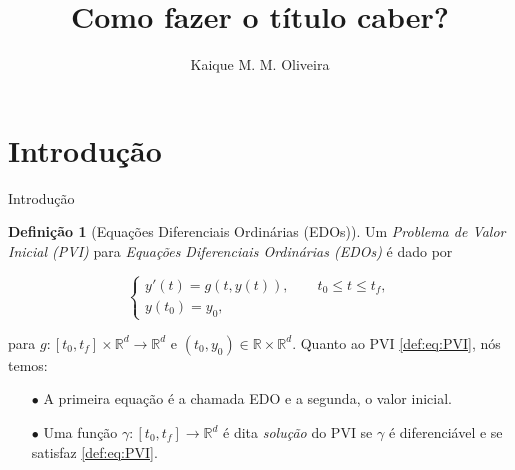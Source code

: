\documentclass{beamer}
\title{Como fazer o título caber?}
\author[Kaique Oliveira]{Kaique M. M. Oliveira}
\newcommand{\R}{\mathbb{R}}
\theoremstyle{plain}
\theoremstyle{definition}
\newtheorem{defi}{Definição}
\begin{document}
\typesetFrontSlides







\section{Introdução}
\begin{frame}{Introdução}

    \begin{defi}[Equações Diferenciais Ordinárias (EDOs)]
        \label{def:1:EDO} 
        Um \textit{Problema de Valor Inicial (PVI)} para \textit{Equações Diferenciais Ordinárias (EDOs)} é dado por


        \begin{equation}
            \begin{cases}
                y'(t) = g(t, y(t)), \qquad t_0 \leq t\leq t_f,\\
                y(t_0) = y_0,
            \end{cases}
            \label{def:eq:PVI}
        \end{equation}



        para $g: [t_0, t_f] \times \R^d \to \R^d$ e $(t_0, y_0) \in \R \times \R^d$. Quanto ao PVI \ref{def:eq:PVI}, nós temos:

        \begin{enumerate}
            \item[$\bullet$] A primeira equação é a chamada EDO e a segunda, o valor inicial.
            \item[$\bullet$] Uma função $\gamma: [t_0, t_f] \to \R^d$ é dita \textit{solução} do PVI se $\gamma$ é diferenciável e se satisfaz \ref{def:eq:PVI}.
        \end{enumerate}

    \end{defi}

\end{frame}

\end{document}
